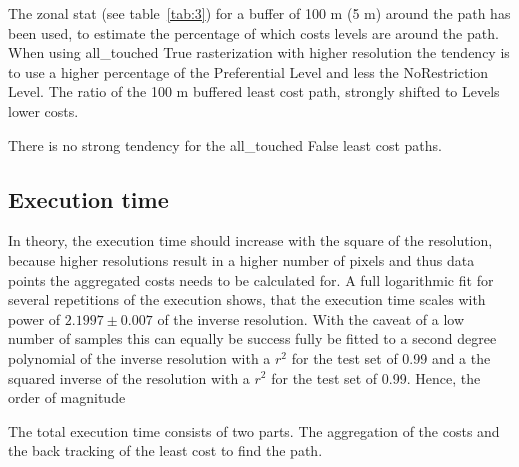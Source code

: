 The zonal stat (see table~\ref{tab:3}) for a buffer of 100 m (5 m) around the path has been used, to estimate the
percentage of which costs levels are around the path.
When using all\_touched True rasterization with higher resolution the tendency is to use a higher percentage of the
Preferential Level and less the NoRestriction Level.
The ratio of the 100 m buffered least cost path, strongly shifted  to Levels lower costs.

There is no strong tendency for the all\_touched False least cost paths.

\subsection{Execution time}\label{subsec:execution-time}

In theory, the execution time should increase with the square of the resolution, because higher resolutions result in a higher number of pixels and thus data points the aggregated costs needs to be calculated for. 
A full logarithmic fit for several repetitions of the execution shows, that the execution time scales with power of $2.1997  \pm 0.007$ of the inverse resolution. 
With the caveat of a low number of samples this can equally be success fully be fitted to a second degree polynomial of the inverse resolution with a $r^2$ for the test set of 0.99 and a the squared inverse of the resolution with a $r^2$ for the test set of 0.99.
Hence, the order of magnitude

The total execution time consists of two parts. 
The aggregation of the costs and the back tracking of the least cost to find the path.

\setlength{\tabcolsep}{10pt}

